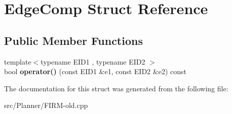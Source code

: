 \hypertarget{struct_edge_comp}{\section{\-Edge\-Comp \-Struct \-Reference}
\label{struct_edge_comp}
}
\subsection*{\-Public \-Member \-Functions}
\begin{DoxyCompactItemize}
\item 
\hypertarget{struct_edge_comp_a90f9e5edf3656c4b574d58a2323805dc}{{\footnotesize template$<$typename E\-I\-D1 , typename E\-I\-D2 $>$ }\\bool {\bfseries operator()} (const \-E\-I\-D1 \&e1, const \-E\-I\-D2 \&e2) const }\label{struct_edge_comp_a90f9e5edf3656c4b574d58a2323805dc}

\end{DoxyCompactItemize}


\-The documentation for this struct was generated from the following file\-:\begin{DoxyCompactItemize}
\item 
src/\-Planner/\-F\-I\-R\-M-\/old.\-cpp\end{DoxyCompactItemize}
